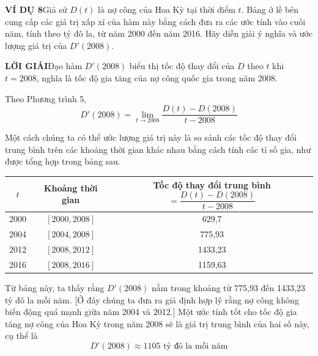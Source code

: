 \begin{minipage}[t]{126mm}
  {\color{stewartblue}\textbf{\textsf{VÍ DỤ 8}}}\hspace{0.8em}Giả sử $D(t)$ là nợ công của Hoa Kỳ tại thời điểm $t$. Bảng ở lề bên cung cấp các giá trị xấp xỉ của hàm này bằng cách đưa ra các ước tính vào cuối năm, tính theo tỷ đô la, từ năm 2000 đến năm 2016. Hãy diễn giải ý nghĩa và ước lượng giá trị của $D'(2008)$.\par

  \vspace{3mm}
  {\color{stewartblue}\textbf{\textsf{LỜI GIẢI}}}\hspace{0.8em}Đạo hàm $D'(2008)$ biểu thị tốc độ thay đổi của $D$ theo $t$ khi $t = 2008$, nghĩa là tốc độ gia tăng của nợ công quốc gia trong năm 2008.\par

  \vspace{2mm}
  Theo Phương trình 5,
  \begin{equation*}
    D'(2008) = \lim_{t \to 2008} \frac{D(t) - D(2008)}{t - 2008}
  \end{equation*}

  Một cách chúng ta có thể ước lượng giá trị này là so sánh các tốc độ thay đổi trung bình trên các khoảng thời gian khác nhau bằng cách tính các tỉ số gia, như được tổng hợp trong bảng sau.

  \vspace{2.5mm}
  \begin{center}
    \renewcommand{\arraystretch}{1.35}
    \setlength{\tabcolsep}{8pt}
    \begin{tabular}{|c|c|c|}
      \hline
      \rowcolor{tableheader}
      \rule[-2ex]{0pt}{5ex} $t$ & Khoảng thời gian & Tốc độ thay đổi trung bình $= \dfrac{D(t) - D(2008)}{t - 2008}$ \\
      \hline
      2000 & $[2000, 2008]$ & \phantom{0}629{,}7\phantom{0} \\
      2004 & $[2004, 2008]$ & \phantom{0}775{,}93 \\
      2012 & $[2008, 2012]$ & 1433{,}23 \\
      2016 & $[2008, 2016]$ & 1159{,}63 \\
      \hline
    \end{tabular}
  \end{center}

  \vspace{2mm}
  Từ bảng này, ta thấy rằng $D'(2008)$ nằm trong khoảng từ 775{,}93 đến 1433{,}23 tỷ đô la mỗi năm. [Ở đây chúng ta đưa ra giả định hợp lý rằng nợ công không biến động quá mạnh giữa năm 2004 và 2012.] Một ước tính tốt cho tốc độ gia tăng nợ công của Hoa Kỳ trong năm 2008 sẽ là giá trị trung bình của hai số này, cụ thể là
  \begin{equation*}
    D'(2008) \approx 1105 \text{ tỷ đô la mỗi năm}
  \end{equation*}


\end{minipage}
